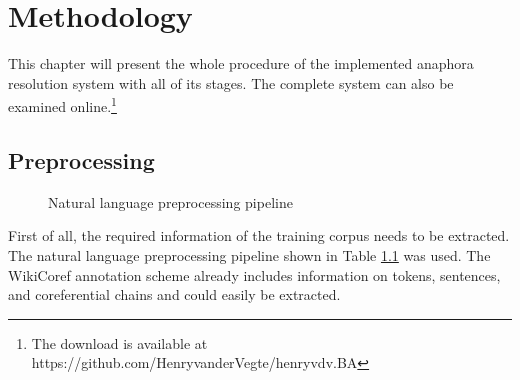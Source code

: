 \chapter{Methodology}
\label{sec:Methodology}
This chapter will present the whole procedure of the implemented anaphora resolution system with all of its stages. The complete system can also be examined online.\footnote{The download is available at https://github.com/HenryvanderVegte/henryvdv.BA}

\section{Preprocessing}
\begin{figure}[h]
	\centering

	\caption{Natural language preprocessing pipeline}
	\label{figure:nlppipeline}
\end{figure}

First of all, the required information of the training corpus needs to be extracted. The natural language preprocessing pipeline shown in Table \ref{figure:nlppipeline} was used.  The WikiCoref annotation scheme already includes information on tokens, sentences, and coreferential chains and could easily be extracted.

